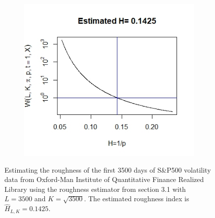 \documentclass{article}
\begin{document}
\begin{figure}[htbp]
    \centering
    
    \begin{subfigure}{0.78\textwidth}
        \includegraphics[width=\linewidth]{volisW.jpeg}
    \end{subfigure}
    
    \caption{Estimating the roughness of the first 3500 days of S\&P500 volatility data from Oxford-Man Institute of Quantitative Finance Realized Library using the roughness estimator from section 3.1 with $L=3500$ and $K=\sqrt{3500}$. The estimated roughness index is $\hat{H}_{L,K}=0.1425$.}
    \label{fig:oxfordw}
\end{figure}\\
\end{document}
